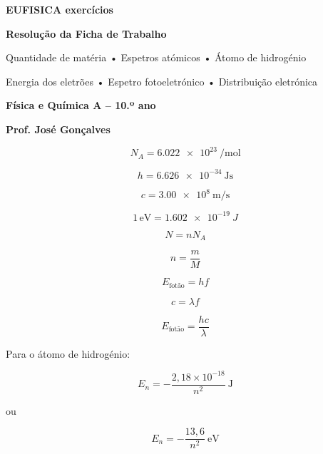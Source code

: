 \documentclass[11pt,a4paper]{article}
\begin{document}
	
	
	\begin{tcolorbox}[
		enhanced,
		colback=eudark,
		colframe=eudark,
		arc=3mm,
		boxrule=0pt,
		left=5mm,
		right=5mm,
		top=5mm,
		bottom=5mm
		]
		
		\begin{center}
			
			{\Huge\bfseries\color{white} EUFISICA exercícios}
			
			\vspace{2mm}
			
			{\Large\bfseries\color{white}
				Resolução da Ficha de Trabalho}
			
			\vspace{2mm}
			
			{\large\color{eulightblue}
				Quantidade de matéria • Espetros atómicos • Átomo de hidrogénio}
			
			{\large\color{eulightblue}
				Energia dos eletrões • Espetro fotoeletrónico • Distribuição eletrónica}
			
			\vspace{4mm}
			
			{\large\color{white}\textbf{Física e Química A -- 10.º ano}}
			
			\vspace{2mm}
			
			{\color{white}\textbf{Prof. José Gonçalves}}
			
		\end{center}
		
	\end{tcolorbox}
	
	
	\begin{recorda}
		
		\[
		N_A=\SI{6.022e23}{\per\mole}
		\]
		
		\[
		h=\SI{6.626e-34}{\joule\second}
		\]
		
		\[
		c=\SI{3.00e8}{\meter\per\second}
		\]
		
		\[
		1\,\mathrm{eV}
		=
		\SI{1.602e-19}{J}
		\]
		
		\[
		N=nN_A
		\]
		
		\[
		n=\frac{m}{M}
		\]
		
		\[
		E_{\text{fotão}}=h f
		\]
		
		\[
		c=\lambda f
		\]
		
		\[
		E_{\text{fotão}}
		=
		\frac{hc}{\lambda}
		\]
		
		Para o átomo de hidrogénio:
		
		\[
		\boxed{
			E_n=-\frac{2,18\times10^{-18}}{n^2}\ \mathrm{J}
		}
		\]
		
		ou
		
		\[
		\boxed{
			E_n=-\frac{13,6}{n^2}\ \mathrm{eV}
		}
		\]
		
	\end{recorda}
	
\end{document}

